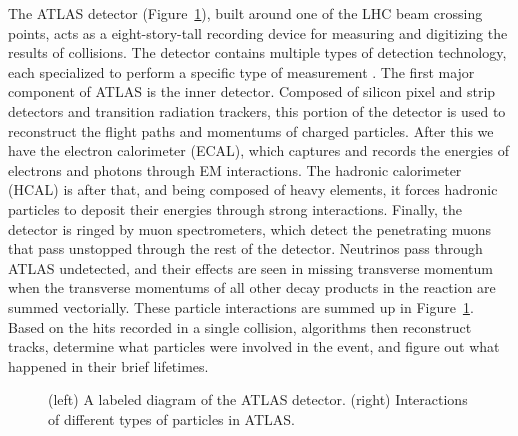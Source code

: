 The ATLAS detector (Figure~\ref{ATLAS}), built around one of the LHC beam crossing points, acts as a eight-story-tall recording device for measuring and digitizing the results of collisions. The detector contains multiple types of detection technology, each specialized to perform a specific type of measurement \cite{ATLAS_website}. The first major component of ATLAS is the inner detector. Composed of silicon pixel and strip detectors and transition radiation trackers, this portion of the detector is used to reconstruct the flight paths and momentums of charged particles. After this we have the electron calorimeter (ECAL), which captures and records the energies of electrons and photons through EM interactions. The hadronic calorimeter (HCAL) is after that, and being composed of heavy elements, it forces hadronic particles to deposit their energies through strong interactions. Finally, the detector is ringed by muon spectrometers, which detect the penetrating muons that pass unstopped through the rest of the detector. Neutrinos pass through ATLAS undetected, and their effects are seen in missing transverse momentum when the transverse momentums of all other decay products in the reaction are summed vectorially. These particle interactions are summed up in Figure~\ref{ATLAS}. Based on the hits recorded in a single collision, algorithms then reconstruct tracks, determine what particles were involved in the event, and figure out what happened in their brief lifetimes.

\begin{figure}[t]
    \centering
    \caption{(left) A labeled diagram of the ATLAS detector. (right) Interactions of different types of particles in ATLAS.}
    \label{ATLAS}
\end{figure}


